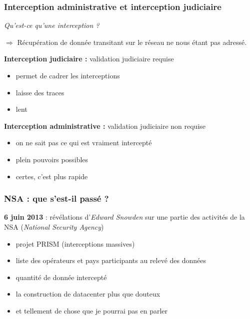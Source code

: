 \begin{frame}\frametitle{Interception administrative et interception judiciaire}
    \emph{Qu'est-ce qu'une interception ?}

    $\Rightarrow$ Récupération de donnée transitant sur le réseau ne nous étant
    pas adressé.

    \vspace{1em}

    \textbf{Interception judiciaire :} validation judiciaire requise
    \begin{itemize}
        \item permet de cadrer les interceptions
        \item laisse des traces
        \item lent
    \end{itemize}

    \textbf{Interception administrative :} validation judiciaire non requise
    \begin{itemize}
        \item on ne sait pas ce qui est vraiment intercepté
        \item plein pouvoirs possibles
        \item certes, c'est plus rapide
    \end{itemize}
\end{frame}


\begin{frame}\frametitle{NSA : que s'est-il passé ?}
    \textbf{6 juin 2013} : révélations d'\emph{Edward Snowden} sur une partie des
    activités de la \textsc{NSA} (\emph{National Security Agency})

    \begin{itemize}
        \item projet PRISM (interceptions massives)
        \item liste des opérateurs et pays participants au relevé des données
        \item quantité de donnée intercepté
        \item la construction de datacenter plus que douteux
        \item et tellement de chose que je pourrai pas en parler
    \end{itemize}
\end{frame}


